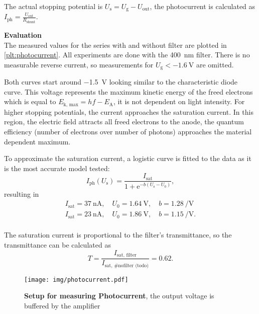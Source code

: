The actual stopping potential is $U_\text{s} = U_\text{g} - U_\text{out}$, the photocurrent is calculated as $I_\text{ph} = \frac{U_\text{out}}{R_\text{shunt}}$.

\textbf{Evaluation}\\
The measured values for the series with and without filter are plotted in \autoref{plt:photocurrent}.
All experiments are done with the \SI{400}{\nm} filter.
There is no measurable reverse current, so measurements for $U_\text{g} < \SI{-1.6}{\volt}$ are omitted.

Both curves start around \SI{-1.5}{\volt} looking similar to the characteristic diode curve.
This voltage represents the maximum kinetic energy of the freed electrons which is equal to $E_\text{k, max} = hf - E_\text{A}$, it is not dependent on light intensity.
For higher stopping potentials, the current approaches the saturation current.
In this region, the electric field attracts all freed electrons to the anode, the quantum efficiency (number of electrons over number of photons) approaches the material dependent maximum.

To approximate the saturation current, a logistic curve is fitted to the data as it is the most accurate model tested:
\begin{equation*}
	I_\text{ph}(U_\text{s}) = \frac{I_\text{sat}}{1 + \mathrm{e}^{-b (U_\text{s} - U_0)}},
\end{equation*}
resulting in
\begin{gather*}
	I_\text{sat} = \SI{37}{\nA}, \quad U_0 = \SI{1.64}{\volt}, \quad b = \SI{1.28}{\per\volt} \tag{no filter}\\
	I_\text{sat} = \SI{23}{\nA}, \quad U_0 = \SI{1.86}{\volt}, \quad b = \SI{1.15}{\per\volt}. \tag{filter}\\
\end{gather*}

The saturation current is proportional to the filter's transmittance, so the transmittance can be calculated as
\begin{equation*}
	T = \frac{I_\text{sat, filter}}{I_\text{sat, \#nofilter (todo)}} = \num{0.62}.
\end{equation*}

\begin{figure}[tbp]
	\centering
	\texttt{[image: img/photocurrent.pdf]}
	\caption[Setup for measuring Photocurrent]{\textbf{Setup for measuring Photocurrent}, the output voltage is buffered by the amplifier}
	\label{sch:photocurrent}
\end{figure}

